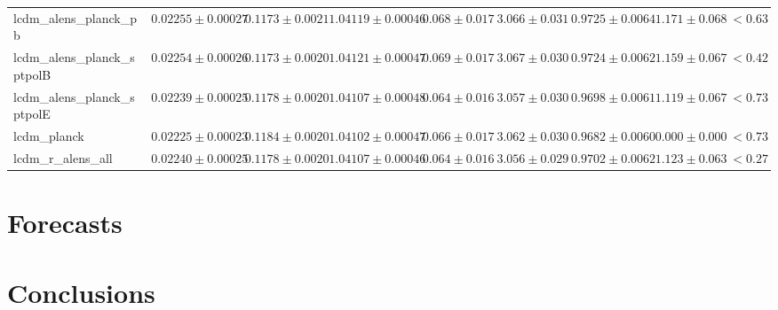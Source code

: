 \documentclass[preprint]{emulateapj}
\begin{document}
\begin{table*}[htb]
\begin{center}
\begin{tabular}{l || c c c c c c c | c}
lcdm\_alens\_planck\_pb & $ 0.02255\pm  0.00027$ & $ 0.1173\pm  0.0021$ & $ 1.04119\pm  0.00046$ & $ 0.068\pm  0.017$ & $ 3.066\pm  0.031$ & $ 0.9725\pm  0.0064$ & $ 1.171 \pm  0.068$ & $< 0.63$ \\
lcdm\_alens\_planck\_sptpolB & $ 0.02254\pm  0.00026$ & $ 0.1173\pm  0.0020$ & $ 1.04121\pm  0.00047$ & $ 0.069\pm  0.017$ & $ 3.067\pm  0.030$ & $ 0.9724\pm  0.0062$ & $ 1.159 \pm  0.067$ & $< 0.42$ \\
lcdm\_alens\_planck\_sptpolE & $ 0.02239\pm  0.00025$ & $ 0.1178\pm  0.0020$ & $ 1.04107\pm  0.00048$ & $ 0.064\pm  0.016$ & $ 3.057\pm  0.030$ & $ 0.9698\pm  0.0061$ & $ 1.119 \pm  0.067$ & $< 0.73$ \\
lcdm\_planck & $ 0.02225\pm  0.00023$ & $ 0.1184\pm  0.0020$ & $ 1.04102\pm  0.00047$ & $ 0.066\pm  0.017$ & $ 3.062\pm  0.030$ & $ 0.9682\pm  0.0060$ & $ 0.000 \pm  0.000$ & $< 0.73$ \\
lcdm\_r\_alens\_all & $ 0.02240\pm  0.00025$ & $ 0.1178\pm  0.0020$ & $ 1.04107\pm  0.00046$ & $ 0.064\pm  0.016$ & $ 3.056\pm  0.029$ & $ 0.9702\pm  0.0062$ & $ 1.123 \pm  0.063$ & $< 0.27$ \\
\end{tabular}
 \normalsize
\end{center}
\end{table*}

\section{Forecasts}
\label{sec:forecasts}

\section{Conclusions}
\label{sec:conclusions}




\end{document}
